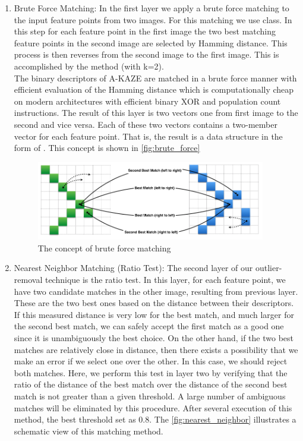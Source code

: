 \begin {enumerate}
  \item Brute Force Matching: In the first layer we apply a brute force matching to the input feature points from two images. For this matching we use  class. In this step for each feature point in the first image the two best matching feature points in the second image are selected by Hamming distance. This process is then reverses from the second image to the first image. This is accomplished by the  method (with k=2).\\
  The binary descriptors of A-KAZE are matched in a brute force manner with efficient evaluation of the Hamming distance which is computationally cheap on modern architectures with efficient binary XOR and population count instructions.
  The result of this layer is two vectors one from first image to the second and vice versa. Each of these two vectors contains a two-member vector for each feature point. That is, the result is a data structure in the form of . This concept is shown in \autoref{fig:brute_force}

  \begin{figure}[H]
  \centering
  \includegraphics[width=100mm]{figures/brute_force}
  \caption{The concept of brute force matching}\label{fig:brute_force}
  \end{figure}
  \item Nearest Neighbor Matching (Ratio Test): The second layer of our outlier-removal technique is the ratio test. In this layer, for each feature point, we have two candidate matches in the other image, resulting from previous layer. These are the two best ones based on the distance between their descriptors. If this measured distance is very low for the best match, and much larger for the second best match, we can safely accept the first match as a good one since it is unambiguously the best choice. On the other hand, if the two best matches are relatively close in distance, then there exists a possibility that we make an error if we select one over the other. In this case, we should reject both matches. Here, we perform this test in layer two by verifying that the ratio of the distance of the best match over the distance of the second best match is not greater than a given threshold. A large number of ambiguous matches will be eliminated by this procedure. After several execution of this method, the best threshold set as 0.8. The \autoref{fig:nearest_neighbor} illustrates a schematic view of this matching method.


\end{enumerate}
